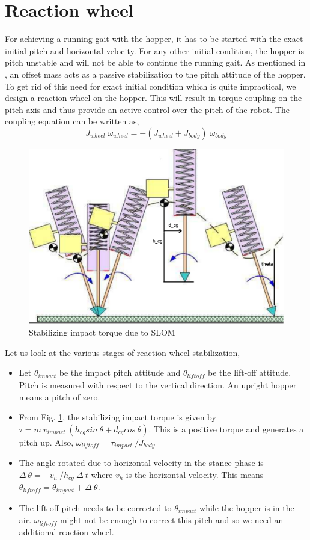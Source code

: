 \section{Reaction wheel}
\label{sec:4_rewac}
For achieving a running gait with the hopper, it has to be started with the exact initial pitch and horizontal velocity.
For any other initial condition, the hopper is pitch unstable and will not be able to continue the running gait.
As mentioned in \cite{shanmug}, an offset mass acts as a passive stabilization to the pitch attitude of the hopper.
To get rid of this need for exact initial condition which is quite impractical, we design a reaction wheel on the hopper.
This will result in torque coupling on the pitch axis and thus provide an active control over the pitch of the robot.
The coupling equation can be written as,
\begin{equation}
J_{wheel}\;\omega_{wheel} = -(J_{wheel} + J_{body})\;\omega_{body}
\end{equation}
\begin{figure}[!h]
\centering
\includegraphics[scale=1]{fig/slom_motion.pdf}
\caption{Stabilizing impact torque due to SLOM}
\label{fig:4_rewac}
\end{figure}
Let us look at the various stages of reaction wheel stabilization,
\begin{itemize}
\item
Let $\theta_{impact}$ be the impact pitch attitude and $\theta_{liftoff}$ be the lift-off attitude. Pitch is measured with respect to
the vertical direction. An upright hopper means a pitch of zero.
\item
From Fig. \ref{fig:4_rewac}, the stabilizing impact torque is given by \mbox{$\tau = m\:v_{impact}\:(h_{cg} sin\:\theta + d_{cg} cos\:\theta)$}. This is a positive torque and generates a pitch up. Also, \mbox{$\omega_{liftoff} = \tau_{impact}\:/J_{body}$}
\item
The angle rotated due to horizontal velocity in the stance phase is $\Delta\:\theta = -v_h\:/h_{cg}\:\Delta\:t$ where $v_h$ is the horizontal velocity. This means
$\theta_{liftoff} = \theta_{impact} + \Delta\:\theta$.
\item
The lift-off pitch needs to be corrected to $\theta_{impact}$ while the hopper is in the air. $\omega_{liftoff}$ might not be enough
to correct this pitch and so we need an additional reaction wheel.
\end{itemize}
